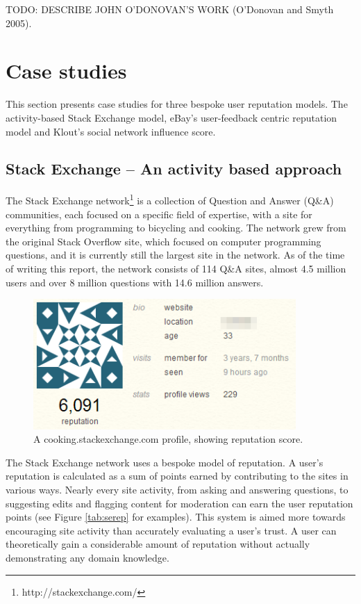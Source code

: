 \documentclass[]{final_report}
\begin{document}
TODO: DESCRIBE JOHN O'DONOVAN'S WORK (O'Donovan and Smyth 2005).

\section{Case studies}

This section presents case studies for three bespoke user reputation models. The activity-based Stack Exchange model, eBay's user-feedback centric reputation model and Klout's social network influence score.

\subsection{Stack Exchange -- An activity based approach}

The Stack Exchange network\footnote{http://stackexchange.com/} is a collection of Question and Answer (Q\&A) communities, each focused on a specific field of expertise, with a site for everything from programming to bicycling and cooking. The network grew from the original Stack Overflow site, which focused on computer programming questions, and it is currently still the largest site in the network. As of the time of writing this report, the network consists of 114 Q\&A sites, almost 4.5 million users and over 8 million questions with 14.6 million answers.

\begin{figure}[ht!]
\centering
\includegraphics[width=100mm]{chap2/serep.png}
\caption{A cooking.stackexchange.com profile, showing reputation score.}
\end{figure}\label{gra:serep}

The Stack Exchange network uses a bespoke model of reputation. A user's reputation is calculated as a sum of points earned by contributing to the sites in various ways. Nearly every site activity, from asking and answering questions, to suggesting edits and flagging content for moderation can earn the user reputation points (see Figure \ref{tab:serep} for examples). This system is aimed more towards encouraging site activity than accurately evaluating a user's trust. A user can theoretically gain a considerable amount of reputation without actually demonstrating any domain knowledge.
\end{document}
